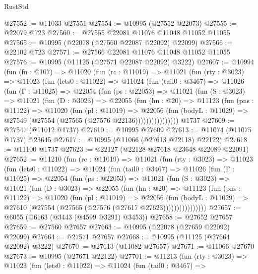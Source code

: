 \begin{lexlean}{RustStd}
\begin{coremodule}
@27552 := @11033 @27551
@27554 := @10995 (@27552 @22073)
@27555 := @22079 @723
@27560 := @27555 @22081 @11076 @11048 @11052 @11055
@27565 := @10995 (@22078 (@27560 @22087 @22092) @22099)
@27566 := @22102 @723
@27571 := @27566 @22081 @11076 @11048 @11052 @11055
@27576 := @10995 (@11125 (@27571 @22087 @22092) @3222)
@27607 := @10994
    (fun (fn : @107) =>
    @11020
      (fun (rc : @11019) =>
      @11021
        (fun (rty : @3023) =>
        @11023
          (fun (lets0 : @11022) =>
          @11024
            (fun (tail0 : @3467) =>
            @11026
              (fun (Γ : @11025) =>
              @22054
                (fun (ps : @22053) =>
                @11021
                  (fun (S : @3023) =>
                  @11021
                    (fun (D : @3023) =>
                    @22055
                      (fun (hn : @20) =>
                      @11123
                        (fun (pns : @11122) =>
                        @11020
                          (fun (pl : @11019) =>
                          @22056
                            (fun (bodyL : @11029) =>
                            @27549 (@27554 (@27565 (@27576 @22136))))))))))))))))
    @1737
@27609 := @27547 (@11012 @1737)
@27610 := @10995 @27609
@27613 := @11074 (@11075 @1737) @23645
@27617 := @10995 (@11066 (@27613 @22118) @22122)
@27618 := @11100 @1737
@27623 := @22127 (@22128 @27618 @23648 @22089 @22091)
@27652 := @11210
    (fun (rc : @11019) =>
    @11021
      (fun (rty : @3023) =>
      @11023
        (fun (lets0 : @11022) =>
        @11024
          (fun (tail0 : @3467) =>
          @11026
            (fun (Γ : @11025) =>
            @22054
              (fun (ps : @22053) =>
              @11021
                (fun (S : @3023) =>
                @11021
                  (fun (D : @3023) =>
                  @22055
                    (fun (hn : @20) =>
                    @11123
                      (fun (pns : @11122) =>
                      @11020
                        (fun (pl : @11019) =>
                        @22056
                          (fun (bodyL : @11029) =>
                          @27610 (@27554 (@27565 (@27576 (@27617 @27623))))))))))))))))
@27657 := @6055 (@6163 (@3443 (@4599 @3291) @3453))
@27658 := @27652 @27657
@27659 := @27560 @27657
@27663 := @10995 (@22078 (@27659 @22092) @22099)
@27664 := @27571 @27657
@27668 := @10995 (@11125 (@27664 @22092) @3222)
@27670 := @27613 (@11082 @27657)
@27671 := @11066 @27670
@27673 := @10995 (@27671 @22122)
@27701 := @11213
    (fun (rty : @3023) =>
    @11023
      (fun (lets0 : @11022) =>
      @11024
        (fun (tail0 : @3467) =>

\end{coremodule}
\end{lexlean}
